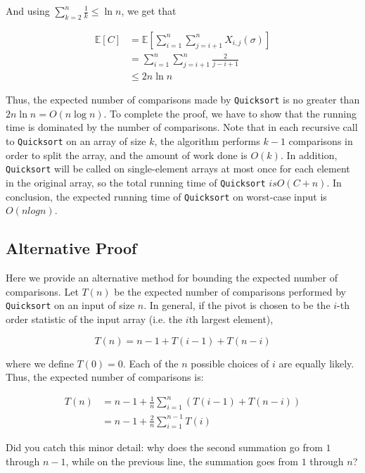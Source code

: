 \documentclass [12pt]{article}
\begin{document}
And using $\sum_{k=2}^n \frac{1}{k} \leq \ln n$, we get that

\begin{align*}
\mathbb{E}[C] &= \mathbb{E}\left[\sum_{i=1}^n \sum_{j = i + 1}^n X_{i,j}(\sigma) \right] \\
&= \sum_{i=1}^n \sum_{j = i + 1}^n \frac{2}{j-i + 1}\\
&\leq 2n \ln n
\end{align*}
 
 Thus, the expected number of comparisons made by \texttt{Quicksort} is no greater than $2n \ln n = O(n \log n)$. To complete the proof, we have to show that the running time is dominated by the number of comparisons. Note that in each recursive call to \texttt{Quicksort} on an array of size $k$, the algorithm performs $k - 1$ comparisons in order to split the array, and the amount of work done is $O(k)$. In addition, \texttt{Quicksort} will be called on single-element arrays at most once for each element in the original array, so the total running time of \texttt{Quicksort} $is O(C + n)$. In conclusion, the expected running time of \texttt{Quicksort} on worst-case input is $O(n log n)$.

 \subsection{Alternative Proof}

Here we provide an alternative method for bounding the expected number of comparisons. Let $T(n)$ be the expected number of comparisons performed by \texttt{Quicksort} on an input of size $n$. In general, if the pivot is chosen to be the $i$-th order statistic of the input array (i.e. the $i$th largest element),

$$
T(n) = n - 1 + T(i - 1) + T(n - i)
$$

where we define $T(0) = 0$. Each of the $n$ possible choices of $i$ are equally likely. Thus, the
expected number of comparisons is:

\begin{align*}
T(n) &= n - 1 + \frac{1}{n} \sum_{i=1}^n \left(T(i - 1) + T(n - i)\right) \\
&= n - 1 + \frac{2}{n} \sum_{i=1}^{n-1} T(i) \tag{Each $T(i)$ shows up twice in the sum}
\end{align*}

Did you catch this minor detail: why does the second summation go from $1$ through $n - 1$, while on the previous line, the summation goes from $1$ through $n$?
\end{document}
